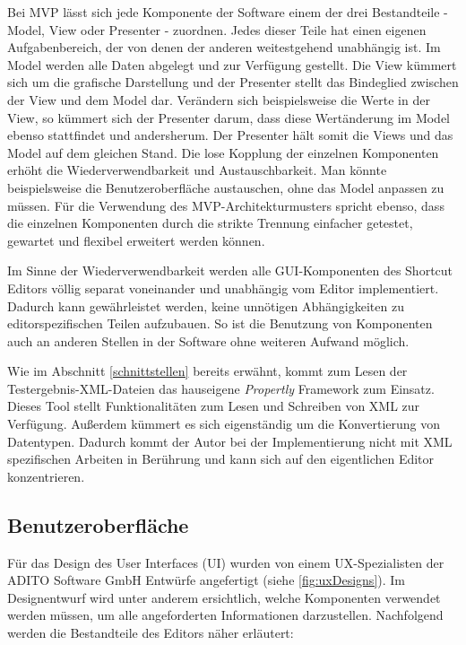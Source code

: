 Bei MVP lässt sich jede Komponente der Software einem der drei Bestandteile - Model, View oder Presenter - zuordnen. Jedes dieser Teile hat einen eigenen Aufgabenbereich, der von denen der anderen weitestgehend unabhängig ist. Im Model werden alle Daten abgelegt und zur Verfügung gestellt. Die View kümmert sich um die grafische Darstellung und der Presenter stellt das Bindeglied zwischen der View und dem Model dar. Verändern sich beispielsweise die Werte in der View, so kümmert sich der Presenter darum, dass diese Wertänderung im Model ebenso stattfindet und andersherum. Der Presenter hält somit die Views und das Model auf dem gleichen Stand. Die lose Kopplung der einzelnen Komponenten erhöht die Wiederverwendbarkeit und Austauschbarkeit. Man könnte beispielsweise die Benutzeroberfläche austauschen, ohne das Model anpassen zu müssen. Für die Verwendung des MVP-Architekturmusters spricht ebenso, dass die einzelnen Komponenten durch die strikte Trennung einfacher getestet, gewartet und flexibel erweitert werden können.

\vfill

Im Sinne der Wiederverwendbarkeit werden alle GUI-Komponenten des Shortcut Editors völlig separat voneinander und unabhängig vom Editor implementiert. Dadurch kann gewährleistet werden, keine unnötigen Abhängigkeiten zu editorspezifischen Teilen aufzubauen. So ist die Benutzung von Komponenten auch an anderen Stellen in der Software ohne weiteren Aufwand möglich.

\vfill

Wie im Abschnitt \ref{schnittstellen} bereits erwähnt, kommt zum Lesen der Testergebnis-XML-Dateien das hauseigene \emph{Propertly} Framework zum Einsatz. Dieses Tool stellt Funktionalitäten zum Lesen und Schreiben von XML zur Verfügung. Außerdem kümmert es sich eigenständig um die Konvertierung von Datentypen. Dadurch kommt der Autor bei der Implementierung nicht mit XML spezifischen Arbeiten in Berührung und kann sich auf den eigentlichen Editor konzentrieren.

\newpage

\subsection{Benutzeroberfläche}
\label{ui}

Für das Design des User Interfaces (UI) wurden von einem UX-Spezialisten der ADITO Software GmbH Entwürfe angefertigt (siehe \autoref{fig:uxDesigns}). Im Designentwurf wird unter anderem ersichtlich, welche Komponenten verwendet werden müssen, um alle angeforderten Informationen darzustellen. Nachfolgend werden die Bestandteile des Editors näher erläutert:

